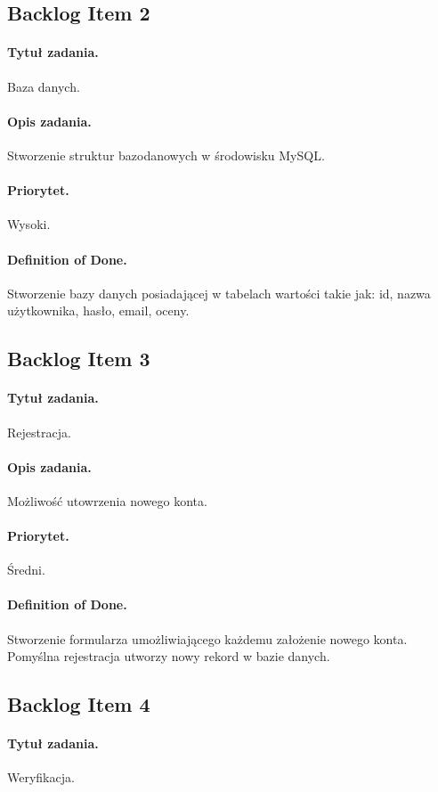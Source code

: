 \documentclass[a4paper]{article}
\begin{document}
\subsection{Backlog Item 2}
\paragraph{Tytuł zadania.} Baza danych.
\paragraph{Opis zadania.} Stworzenie struktur bazodanowych w środowisku MySQL.
\paragraph{Priorytet.} Wysoki.
\paragraph{Definition of Done.} Stworzenie bazy danych posiadającej w tabelach wartości takie jak: id, nazwa użytkownika, hasło, email, oceny.

\subsection{Backlog Item 3}
\paragraph{Tytuł zadania.} Rejestracja.
\paragraph{Opis zadania.} Możliwość utowrzenia nowego konta.
\paragraph{Priorytet.} Średni.
\paragraph{Definition of Done.} Stworzenie formularza umożliwiającego każdemu założenie nowego konta. Pomyślna rejestracja utworzy nowy rekord w bazie danych.

\subsection{Backlog Item 4}
\paragraph{Tytuł zadania.} Weryfikacja.
\end{document}
